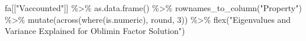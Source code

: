 \documentclass[
]{book}
\newenvironment{Shaded}{\begin{snugshade}}{\end{snugshade}}
\newcommand{\DecValTok}[1]{\textcolor[rgb]{0.00,0.00,0.81}{#1}}
\newcommand{\FunctionTok}[1]{\textcolor[rgb]{0.00,0.00,0.00}{#1}}
\newcommand{\NormalTok}[1]{#1}
\newcommand{\SpecialCharTok}[1]{\textcolor[rgb]{0.00,0.00,0.00}{#1}}
\newcommand{\StringTok}[1]{\textcolor[rgb]{0.31,0.60,0.02}{#1}}
\begin{document}
\begin{Shaded}
\begin{Highlighting}[]
\NormalTok{fa[[}\StringTok{"Vaccounted"}\NormalTok{]] }\SpecialCharTok{\%\textgreater{}\%}
  \FunctionTok{as.data.frame}\NormalTok{() }\SpecialCharTok{\%\textgreater{}\%}
  \FunctionTok{rownames\_to\_column}\NormalTok{(}\StringTok{"Property"}\NormalTok{) }\SpecialCharTok{\%\textgreater{}\%}
    \FunctionTok{mutate}\NormalTok{(}\FunctionTok{across}\NormalTok{(}\FunctionTok{where}\NormalTok{(is.numeric), round, }\DecValTok{3}\NormalTok{)) }\SpecialCharTok{\%\textgreater{}\%}
    \FunctionTok{flex}\NormalTok{(}\StringTok{"Eigenvalues and Variance Explained for Oblimin Factor Solution"}\NormalTok{)}
\end{Highlighting}
\end{Shaded}

\providecommand{\docline}[3]{\noalign{\global\setlength{\arrayrulewidth}{#1}}\arrayrulecolor[HTML]{#2}\cline{#3}}

\setlength{\tabcolsep}{2pt}

\renewcommand*{\arraystretch}{1.5}
\end{document}
